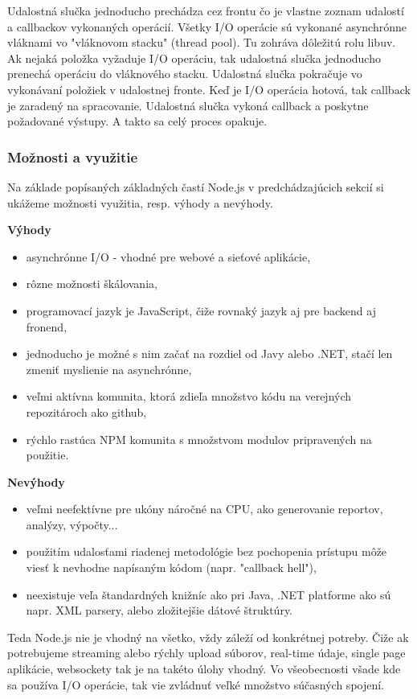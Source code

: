 Udalostná slučka jednoducho prechádza cez frontu čo je vlastne zoznam udalostí a callbackov vykonaných operácií. Všetky I/O operácie sú vykonané asynchrónne vláknami vo "vláknovom stacku" (thread pool). Tu zohráva dôležitú rolu libuv. Ak nejaká položka vyžaduje I/O operáciu, tak udalostná slučka jednoducho prenechá operáciu do vláknového stacku. Udalostná slučka pokračuje vo vykonávaní položiek v udalostnej fronte. Keď je I/O operácia hotová, tak callback je zaradený na spracovanie. Udalostná slučka vykoná callback a poskytne požadované výstupy. A takto sa celý proces opakuje.\cite{nodejs-event-loop}

\subsubsection{Možnosti a využitie}
Na základe popísaných základných častí Node.js v predchádzajúcich sekcií si ukážeme možnosti využitia, resp. výhody a nevýhody.\cite{nodejs-arch}

\textbf{Výhody}
\begin{itemize}
\item asynchrónne I/O - vhodné pre webové a sieťové aplikácie,
\item rôzne možnosti škálovania,
\item programovací jazyk je JavaScript, čiže rovnaký jazyk aj pre backend aj fronend,
\item jednoducho je možné s nim začať na rozdiel od Javy alebo .NET, stačí len zmeniť myslienie na asynchrónne,
\item veľmi aktívna komunita, ktorá zdieľa množstvo kódu na verejných repozitároch ako github,
\item rýchlo rastúca NPM komunita s množstvom modulov pripravených na použitie.
\end{itemize}

\textbf{Nevýhody}
\begin{itemize}
\item veľmi neefektívne pre ukóny náročné na CPU, ako generovanie reportov, analýzy, výpočty...
\item použitím udalosťami riadenej metodológie bez pochopenia prístupu môže viesť k nevhodne napísaným kódom (napr. "callback hell"),
\item neexistuje veľa štandardných knižníc ako pri Java, .NET platforme ako sú napr. XML parsery, alebo zložitejšie dátové štruktúry.
\end{itemize}

Teda Node.js nie je vhodný na všetko, vždy záleží od konkrétnej potreby. Čiže ak potrebujeme streaming alebo rýchly upload súborov, real-time údaje, single page aplikácie, websockety tak je na takéto úlohy vhodný. Vo všeobecnosti všade kde sa používa I/O operácie, tak vie zvládnuť veľké množstvo súčasných spojení.\cite{nodejs-introduction}


